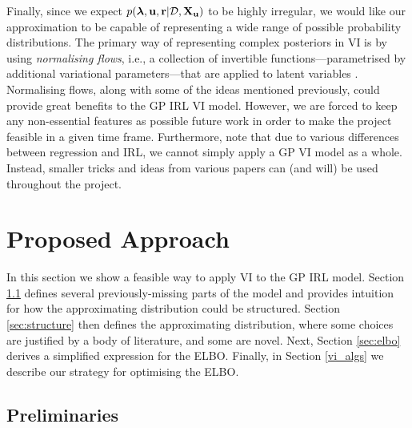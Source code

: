 \documentclass{mprop}
\theoremstyle{definition}
\begin{document}
Finally, since we expect $p(\bm\lambda, \mathbf{u}, \mathbf{r} | \mathcal{D}, \mathbf{X_u})$ to be highly irregular, we would like our
approximation to be capable of representing a wide range of possible probability
distributions. The primary way of representing complex posteriors in VI is by
using \emph{normalising flows}, i.e., a collection of invertible
functions---parametrised by additional variational parameters---that are applied
to latent variables \cite{DBLP:conf/icml/RezendeM15}. Normalising flows, along
with some of the ideas mentioned previously, could provide great benefits to the
GP IRL VI model. However, we are forced to keep any non-essential features as
possible future work in order to make the project feasible in a given time
frame. Furthermore, note that due to various differences between regression and
IRL, we cannot simply apply a GP VI model as a whole. Instead, smaller tricks
and ideas from various papers can (and will) be used throughout the project.

\section{Proposed Approach} \label{sec:proposed_approach}

In this section we show a feasible way to apply VI to the GP IRL model. Section
\ref{sec:preliminaries} defines several previously-missing parts of the model
and provides intuition for how the approximating distribution could be
structured. Section \ref{sec:structure} then defines the approximating
distribution, where some choices are justified by a body of literature, and some
are novel. Next, Section \ref{sec:elbo} derives a simplified expression for the
ELBO. Finally, in Section \ref{vi_algs} we describe our strategy for
optimising the ELBO.

\subsection{Preliminaries} \label{sec:preliminaries}
\end{document}
